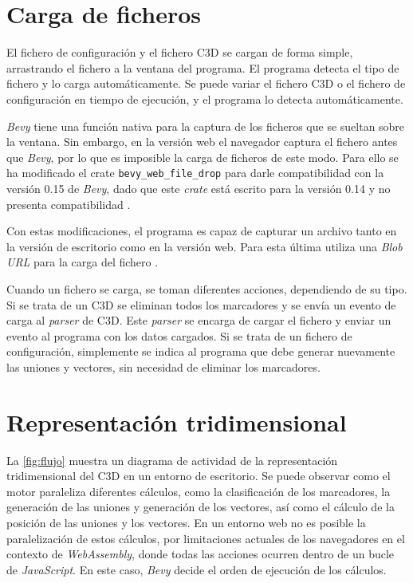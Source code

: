 \section{Carga de ficheros}

El fichero de configuración y el fichero \ac{C3D} se cargan de forma simple, arrastrando el fichero a la ventana del programa. El programa detecta el tipo de fichero y lo carga automáticamente. Se puede variar el fichero \ac{C3D} o el fichero de configuración en tiempo de ejecución, y el programa lo detecta automáticamente.

\textit{Bevy} tiene una función nativa para la captura de los ficheros que se sueltan sobre la ventana. Sin embargo, en la versión web el navegador captura el fichero antes que \textit{Bevy}, por lo que es imposible la carga de ficheros de este modo. Para ello se ha modificado el crate \texttt{bevy\_web\_file\_drop} para darle compatibilidad con la versión 0.15 de \textit{Bevy}, dado que este \textit{crate} está escrito para la versión 0.14 y no presenta compatibilidad \autocite{Bevy_web_file_dropCratesioRust2024}.

Con estas modificaciones, el programa es capaz de capturar un archivo tanto en la versión de escritorio como en la versión web. Para esta última utiliza una \textit{Blob URL} para la carga del fichero \autocite{AnswerWhatBlob2015,FileAPI}.

Cuando un fichero se carga, se toman diferentes acciones, dependiendo de su tipo. Si se trata de un \ac{C3D} se eliminan todos los marcadores y se envía un evento de carga al \textit{parser} de \ac{C3D}. Este \textit{parser} se encarga de cargar el fichero y enviar un evento al programa con los datos cargados. Si se trata de un fichero de configuración, simplemente se indica al programa que debe generar nuevamente las uniones y vectores, sin necesidad de eliminar los marcadores. 

\section{Representación tridimensional} \label{sec:representacion-3d}

La \autoref{fig:flujo} muestra un diagrama de actividad de la representación tridimensional del \ac{C3D} en un entorno de escritorio. Se puede observar como el motor paraleliza diferentes cálculos, como la clasificación de los marcadores, la generación de las uniones y generación de los vectores, así como el cálculo de la posición de las uniones y los vectores. En un entorno web no es posible la paralelización de estos cálculos, por limitaciones actuales de los navegadores en el contexto de \textit{WebAssembly}, donde todas las acciones ocurren dentro de un bucle de \textit{JavaScript}. En este caso, \textit{Bevy} decide el orden de ejecución de los cálculos.

